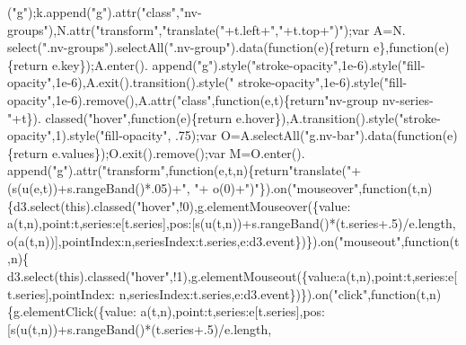 \begin{DoxyCode}
      (\textcolor{stringliteral}{"g"});k.append(\textcolor{stringliteral}{"g"}).attr(\textcolor{stringliteral}{"class"},\textcolor{stringliteral}{"nv-groups"}),N.attr(\textcolor{stringliteral}{"transform"},\textcolor{stringliteral}{"translate("}+t.left+\textcolor{stringliteral}{","}+t.top+\textcolor{stringliteral}{")"});var A=N.
      select(\textcolor{stringliteral}{".nv-groups"}).selectAll(\textcolor{stringliteral}{".nv-group"}).data(\textcolor{keyword}{function}(e)\{\textcolor{keywordflow}{return} e\},\textcolor{keyword}{function}(e)\{\textcolor{keywordflow}{return} e.key\});A.enter().
      append(\textcolor{stringliteral}{"g"}).style(\textcolor{stringliteral}{"stroke-opacity"},1e-6).style(\textcolor{stringliteral}{"fill-opacity"},1e-6),A.exit().transition().style(\textcolor{stringliteral}{"
      stroke-opacity"},1e-6).style(\textcolor{stringliteral}{"fill-opacity"},1e-6).remove(),A.attr(\textcolor{stringliteral}{"class"},\textcolor{keyword}{function}(e,t)\{\textcolor{keywordflow}{return}\textcolor{stringliteral}{"nv-group nv-series-"}+t\}).
      classed(\textcolor{stringliteral}{"hover"},\textcolor{keyword}{function}(e)\{\textcolor{keywordflow}{return} e.hover\}),A.transition().style(\textcolor{stringliteral}{"stroke-opacity"},1).style(\textcolor{stringliteral}{"fill-opacity"},
      .75);var O=A.selectAll(\textcolor{stringliteral}{"g.nv-bar"}).data(\textcolor{keyword}{function}(e)\{\textcolor{keywordflow}{return} e.values\});O.exit().remove();var M=O.enter().
      append(\textcolor{stringliteral}{"g"}).attr(\textcolor{stringliteral}{"transform"},\textcolor{keyword}{function}(e,t,n)\{\textcolor{keywordflow}{return}\textcolor{stringliteral}{"translate("}+(s(u(e,t))+s.rangeBand()*.05)+\textcolor{stringliteral}{", "}+
      o(0)+\textcolor{stringliteral}{")"}\}).on(\textcolor{stringliteral}{"mouseover"},\textcolor{keyword}{function}(t,n)\{d3.select(\textcolor{keyword}{this}).classed(\textcolor{stringliteral}{"hover"},!0),g.elementMouseover(\{value:
      a(t,n),point:t,series:e[t.series],pos:[s(u(t,n))+s.rangeBand()*(t.series+.5)/e.length,
      o(a(t,n))],pointIndex:n,seriesIndex:t.series,e:d3.event\})\}).on(\textcolor{stringliteral}{"mouseout"},\textcolor{keyword}{function}(t,n)\{
      d3.select(\textcolor{keyword}{this}).classed(\textcolor{stringliteral}{"hover"},!1),g.elementMouseout(\{value:a(t,n),point:t,series:e[t.series],pointIndex:
      n,seriesIndex:t.series,e:d3.event\})\}).on(\textcolor{stringliteral}{"click"},\textcolor{keyword}{function}(t,n)\{g.elementClick(\{value:
      a(t,n),point:t,series:e[t.series],pos:[s(u(t,n))+s.rangeBand()*(t.series+.5)/e.length,

\end{DoxyCode}

